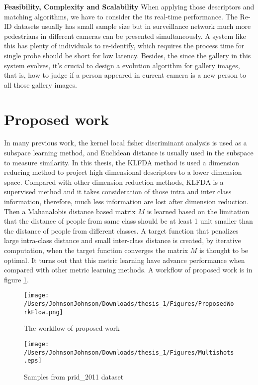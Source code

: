 \textbf{Feasibility, Complexity and Scalability} When applying those descriptors and matching algorithms, we have to consider the its real-time performance.   The Re-ID datasets usually has small sample size but in surveillance network much more pedestrians in different cameras can be presented simultaneously. A system like this has plenty of individuals to re-identify, which requires the process time for single probe should be short for low latency. Besides, the since the gallery in this system evolves, it's crucial to design a evolution algorithm for gallery images, that is, how to judge if a person appeared in current camera is a new person to all those gallery images.

\section{Proposed work}
In many previous work, the kernel local fisher discriminant analysis is used as a subspace learning method, and Euclidean distance is usually used in the subspace to measure similarity. In this thesis, the KLFDA \cite{KLFDA} method is used a dimension reducing method to project high dimensional descriptors to a lower dimension space. Compared with other dimension reduction methods, KLFDA is a supervised method and it takes consideration of those intra and inter class information, therefore, much less information are lost after dimension reduction. Then a Mahanalobis distance based matrix $M$ is learned based on the limitation that the distance of people from same class should be at least 1 unit smaller than the distance of people from different classes. A target function that penalizes large intra-class distance and small inter-class distance is created, by iterative computation, when the target function converges the matrix $M$ is thought to be optimal. It turns out that this metric learning have advance performance when compared with other metric learning methods. A workflow of proposed work is in figure \ref{ProposedWorkflow}.

\begin{figure}[H]

\texttt{[image: /Users/JohnsonJohnson/Downloads/thesis\_1/Figures/ProposedWorkFlow.png]}
\vspace{-2em}
\caption{The workflow of proposed work}
\label{ProposedWorkflow}

\end{figure}
\begin{figure}[H]

\texttt{[image: /Users/JohnsonJohnson/Downloads/thesis\_1/Figures/Multishots.eps]}
\vspace{-2em}
\caption{Samples from prid\_2011 dataset}

\end{figure}


